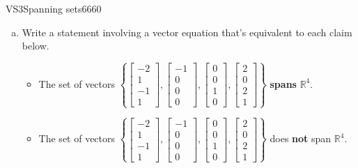 \begin{exercise}{VS3}{Spanning sets}{6660} 
\begin{exerciseStatement} 

\begin{enumerate}[(a)]
\item  

 Write a statement involving a vector equation that's equivalent to each claim below. 

 

\begin{itemize}
\item  

 The set of vectors \(\left\{ \left[\begin{array}{c}
-2 \\
1 \\
-1 \\
1
\end{array}\right] , \left[\begin{array}{c}
-1 \\
0 \\
0 \\
0
\end{array}\right] , \left[\begin{array}{c}
0 \\
0 \\
1 \\
0
\end{array}\right] , \left[\begin{array}{c}
2 \\
0 \\
2 \\
1
\end{array}\right] \right\}\) \textbf{spans} \(\mathbb R^4\). 

 
\item  

 The set of vectors \(\left\{ \left[\begin{array}{c}
-2 \\
1 \\
-1 \\
1
\end{array}\right] , \left[\begin{array}{c}
-1 \\
0 \\
0 \\
0
\end{array}\right] , \left[\begin{array}{c}
0 \\
0 \\
1 \\
0
\end{array}\right] , \left[\begin{array}{c}
2 \\
0 \\
2 \\
1
\end{array}\right] \right\}\) does \textbf{not} span \(\mathbb R^4\). 


\end{itemize}
\end{enumerate}
\end{exerciseStatement}
\end{exercise}
